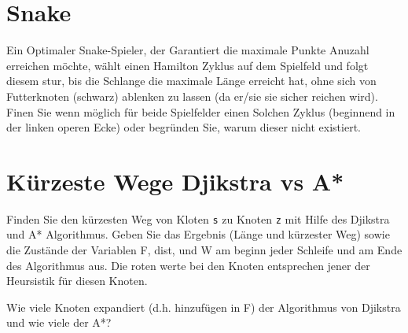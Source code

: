 \documentclass[a4paper,11pt]{report}
\begin{document}
\chapter{Snake}

Ein Optimaler Snake-Spieler, der Garantiert die maximale Punkte Anuzahl erreichen möchte, wählt einen Hamilton Zyklus auf dem Spielfeld und folgt diesem stur, bis die Schlange die maximale Länge erreicht hat, ohne sich von Futterknoten (schwarz) ablenken zu lassen (da er/sie sie sicher reichen wird).
Finen Sie wenn möglich für beide Spielfelder einen Solchen Zyklus (beginnend in der linken operen Ecke) oder begründen Sie, warum dieser nicht existiert.

\newpage

\chapter{Kürzeste Wege Djikstra vs A*}

Finden Sie den kürzesten Weg von Kloten \texttt{s} zu Knoten \texttt{z} mit Hilfe des Djikstra und A* Algorithmus.
Geben Sie das Ergebnis (Länge und kürzester Weg) sowie die Zustände der Variablen F, dist, und W am beginn jeder Schleife und am Ende des Algorithmus aus.
Die roten werte bei den Knoten entsprechen jener der Heursistik für diesen Knoten.

Wie viele Knoten expandiert (d.h. hinzufügen in F) der Algorithmus von Djikstra und wie viele der A*?
\end{document}
